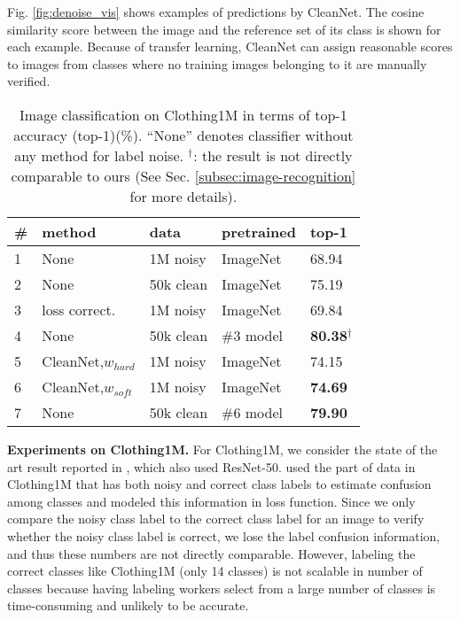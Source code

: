 \documentclass[10pt,twocolumn,letterpaper]{article}
\begin{document}
Fig. \ref{fig:denoise_vis} shows examples of predictions by CleanNet. The cosine similarity score between the image and the reference set of its class is shown for each example. Because of transfer learning, CleanNet can assign reasonable scores to images from classes where no training images belonging to it are manually verified.

\begin{table}
\begin{center}
\small
\begin{tabular}{|l|l|l|l|l|}
\hline
\# & method & data & pretrained & top-1 \\
\hline\hline
1 & None \cite{patrini2017making} & 1M noisy & ImageNet & 68.94 \\
2 & None \cite{patrini2017making} & 50k clean & ImageNet & 75.19 \\
\hline
3 & loss correct. \cite{patrini2017making} & 1M noisy & ImageNet & 69.84 \\
4 & None \cite{patrini2017making} & 50k clean & \#3 model & \textbf{80.38}$^\dagger$ \\
\hline
5 & CleanNet,$w_{hard}$ & 1M noisy & ImageNet & 74.15 \\
6 & CleanNet,$w_{soft}$ & 1M noisy & ImageNet & \textbf{74.69} \\
7 & None & 50k clean & \#6 model & \textbf{79.90} \\
\hline
\end{tabular}
\end{center}
\caption{Image classification on Clothing1M in terms of top-1 accuracy (top-1)(\%). ``None'' denotes classifier without any method for label noise.  $^\dagger$: the result is not directly comparable to ours (See Sec. \ref{subsec:image-recognition} for more details).}
\label{tb:c1m-classification}
\end{table}

\noindent
\textbf{Experiments on Clothing1M.} For Clothing1M, we consider the state of the art result reported in \cite{patrini2017making}, which also used ResNet-50. \cite{patrini2017making} used the part of data in Clothing1M that has both noisy and correct class labels to estimate confusion among classes and modeled this information in loss function. Since we only compare the noisy class label to the correct class label for an image to verify whether the noisy class label is correct, we lose the label confusion information, and thus these numbers are not directly comparable. However, labeling the correct classes like Clothing1M (only 14 classes) is not scalable in number of classes because having labeling workers select from a large number of classes is time-consuming and unlikely to be accurate.
\end{document}
